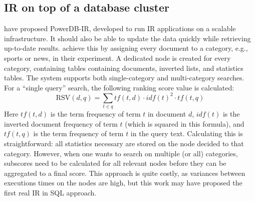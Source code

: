 \subsection{IR on top of a database cluster}
 have proposed PowerDB-IR, developed to run IR applications on a scalable infrastructure. It should also be able to update the data quickly while retrieving up-to-date results.  achieve this by assigning every document to a category, e.g., sports or news, in their experiment. A dedicated node is created for every category, containing tables containing documents, inverted lists, and statistics tables. 
The system supports both single-category and multi-category searches. For a ``single query'' search, the following ranking score value is calculated:
\begin{equation}
	\text{RSV}(d,q) = \sum_{t\in q} \mathit{tf}(t, d) \cdot \mathit{idf}(t)^2 \cdot \mathit{tf}(t, q)
\end{equation}
Here $\mathit{tf}(t, d)$ is the term frequency of term $t$ in document $d$, $\mathit{idf}(t)$ is the inverted document frequency of term $t$ (which is squared in this formula), and $\mathit{tf}(t, q)$ is the term frequency of term $t$ in the query text. Calculating this is straightforward: all statistics necessary are stored on the node decided to that category. However, when one wants to search on multiple (or all) categories, subscores need to be calculated for all relevant nodes before they can be aggregated to a final score. This approach is quite costly, as variances between executions times on the nodes are high, but this work may have proposed the first real IR in SQL approach. 

